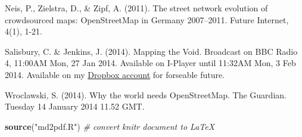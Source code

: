 \documentclass[]{article}
\newenvironment{Shaded}{}{}
\newcommand{\KeywordTok}[1]{\textcolor[rgb]{0.00,0.44,0.13}{\textbf{{#1}}}}
\newcommand{\StringTok}[1]{\textcolor[rgb]{0.25,0.44,0.63}{{#1}}}
\newcommand{\CommentTok}[1]{\textcolor[rgb]{0.38,0.63,0.69}{\textit{{#1}}}}
\newcommand{\NormalTok}[1]{{#1}}
\begin{document}
Neis, P., Zielstra, D., \& Zipf, A. (2011). The street network evolution
of crowdsourced maps: OpenStreetMap in Germany 2007--2011. Future
Internet, 4(1), 1-21.

Salisbury, C. \& Jenkins, J. (2014). Mapping the Void. Broadcast on BBC
Radio 4, 11:00AM Mon, 27 Jan 2014. Available on I-Player until 11:32AM
Mon, 3 Feb 2014. Available on my
\href{https://dl.dropboxusercontent.com/u/15008199/egs2stay/Mapping\_the\_Void\_-\_Mapping\_the\_Void\_b03s6mf0\_default.m4a}{Dropbox
account} for forseable future.

Wroclawski, S. (2014). Why the world needs OpenStreetMap. The Guardian.
Tuesday 14 January 2014 11.52 GMT.

\begin{Shaded}
\begin{Highlighting}[]
\KeywordTok{source}\NormalTok{(}\StringTok{"md2pdf.R"}\NormalTok{)  }\CommentTok{# convert knitr document to LaTeX}
\end{Highlighting}
\end{Shaded}
\end{document}
